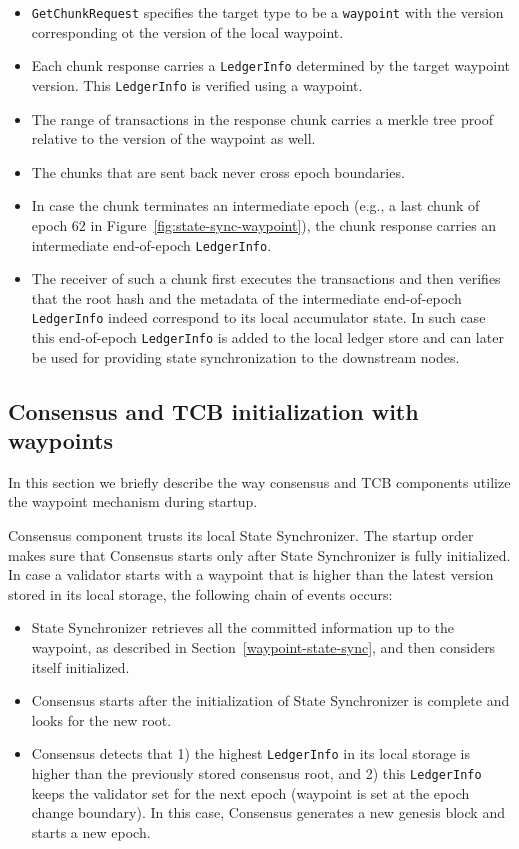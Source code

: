 \documentclass[letterpaper,10pt]{article}
\begin{document}
\begin{itemize}
\item \texttt{GetChunkRequest} specifies the target type to be a \texttt{waypoint} with the version corresponding ot the version of the local waypoint.
\item Each chunk response carries a \texttt{LedgerInfo} determined by the target waypoint version. This \texttt{LedgerInfo} is verified using a waypoint.
\item The range of transactions in the response chunk carries a merkle tree proof relative to the version of the waypoint as well.
\item The chunks that are sent back never cross epoch boundaries.
\item In case the chunk terminates an intermediate epoch (e.g., a last chunk of epoch $62$ in Figure~\ref{fig:state-sync-waypoint}), the chunk response carries an intermediate end-of-epoch \texttt{LedgerInfo}.
\item The receiver of such a chunk first executes the transactions and then verifies that the root hash and the metadata of the intermediate end-of-epoch \texttt{LedgerInfo} indeed correspond to its local accumulator state. In such case this end-of-epoch \texttt{LedgerInfo} is added to the local ledger store and can later be used for providing state synchronization to the downstream nodes.
\end{itemize}

\subsection{Consensus and TCB initialization with waypoints}
\label{waypoint-tcb}
In this section we briefly describe the way consensus and TCB components utilize the waypoint mechanism during startup.

Consensus component trusts its local State Synchronizer. The startup order makes sure that Consensus starts only after State Synchronizer is fully initialized. In case a validator starts with a waypoint that is higher than the latest version stored in its local storage, the following chain of events occurs:
\begin{itemize}
\item State Synchronizer retrieves all the committed information up to the waypoint, as described in Section~\ref{waypoint-state-sync}, and then considers itself initialized.
\item Consensus starts after the initialization of State Synchronizer is complete and looks for the new root.
\item Consensus detects that 1) the highest \texttt{LedgerInfo} in its local storage is higher than the previously stored consensus root, and 2) this \texttt{LedgerInfo} keeps the validator set for the next epoch (waypoint is set at the epoch change boundary). In this case, Consensus generates a new genesis block and starts a new epoch.
\end{itemize}
\end{document}
